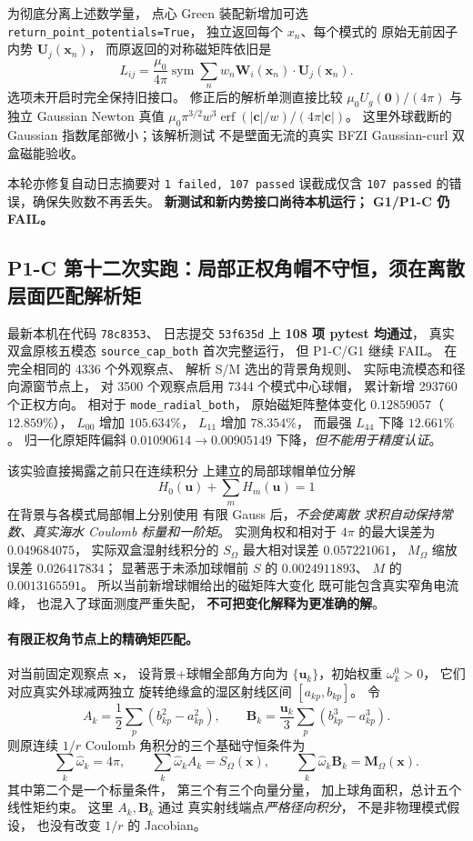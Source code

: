 为彻底分离上述数学量，
点心 Green 装配新增加可选
\texttt{return\_point\_potentials=True}，
独立返回每个 $x_n$、每个模式的
原始无前因子内势 $\bm U_j(\bm x_n)$，
而原返回的对称磁矩阵依旧是
\[
 L_{ij}=\frac{\mu_0}{4\pi}
 \operatorname{sym}\sum_n
 w_n\bm W_i(\bm x_n)\cdot\bm U_j(\bm x_n).
\]
选项未开启时完全保持旧接口。
修正后的解析单测直接比较
$\mu_0U_g(\bm0)/(4\pi)$
与独立 Gaussian Newton 真值
$\mu_0\pi^{3/2}w^3
\operatorname{erf}(|\bm c|/w)/
(4\pi|\bm c|)$。
这里外球截断的 Gaussian
指数尾部微小；该解析测试
不是壁面无流的真实 BFZI
Gaussian-curl 双盒磁能验收。

本轮亦修复自动日志摘要对
\texttt{1 failed, 107 passed}
误截成仅含 \texttt{107 passed}
的错误，确保失败数不再丢失。
\textbf{新测试和新内势接口尚待本机运行；
G1/P1-C 仍 FAIL。}


\subsection{P1-C 第十二次实跑：局部正权角帽不守恒，须在离散层面匹配解析矩}
\label{sec:p1-c-positive-entropy-moment-fit}
最新本机在代码 \texttt{78c8353}、
日志提交 \texttt{53f635d}
上 \textbf{108 项 pytest 均通过}，
真实双盒原核五模态
\texttt{source\_cap\_both} 首次完整运行，
但 P1-C/G1 继续 FAIL。
在完全相同的 4336 个外观察点、
解析 S/M 选出的背景角规则、
实际电流模态和径向源窗节点上，
对 3500 个观察点启用
7344 个模式中心球帽，
累计新增 293760 个正权方向。
相对于 \texttt{mode\_radial\_both}，
原始磁矩阵整体变化
$0.12859057$（$12.859\%$），
$L_{00}$ 增加 $105.634\%$，
$L_{11}$ 增加 $78.354\%$，
而最强 $L_{44}$ 下降 $12.661\%$。
归一化原矩阵偏斜
$0.01090614\to0.00905149$
下降，\emph{但不能用于精度认证}。

该实验直接揭露之前只在连续积分
上建立的局部球帽单位分解
\[
 H_0(\bm u)+\sum_mH_m(\bm u)=1
\]
在背景与各模式局部帽上分别使用
有限 Gauss 后，\emph{不会使离散
求积自动保持常数、真实海水
Coulomb 标量和一阶矩}。
实测角权和相对于 $4\pi$
的最大误差为 $0.049684075$，
实际双盒湿射线积分的
$S_\Omega$ 最大相对误差
$0.057221061$，
$M_\Omega$ 缩放误差
$0.026417834$；
显著恶于未添加球帽前
$S$ 的 $0.0024911893$、
$M$ 的 $0.0013165591$。
所以当前新增球帽给出的磁矩阵大变化
既可能包含真实窄角电流峰，
也混入了球面测度严重失配，
\textbf{不可把变化解释为更准确的解}。

\paragraph{有限正权角节点上的精确矩匹配。}
对当前固定观察点 $\bm x$，
设背景+球帽全部角方向为
$\{\bm u_k\}$，初始权重
$\omega_k^0>0$，
它们对应真实外球减两独立
旋转绝缘盒的湿区射线区间
$[a_{kp},b_{kp}]$。
令
\[
 A_k=\frac12\sum_p(b_{kp}^2-a_{kp}^2),
 \qquad
 \bm B_k=\frac{\bm u_k}{3}
              \sum_p(b_{kp}^3-a_{kp}^3).
\]
则原连续 $1/r$ Coulomb
角积分的三个基础守恒条件为
\[
 \sum_k\widehat\omega_k=4\pi,\qquad
 \sum_k\widehat\omega_k A_k=S_\Omega(\bm x),
 \qquad
 \sum_k\widehat\omega_k\bm B_k
      =\bm M_\Omega(\bm x).
\]
其中第二个是一个标量条件，
第三个有三个向量分量，
加上球角面积，总计五个线性矩约束。
这里 $A_k,\bm B_k$ 通过
真实射线端点\emph{严格径向积分}，
不是非物理模式假设，
也没有改变 $1/r$ 的 Jacobian。

